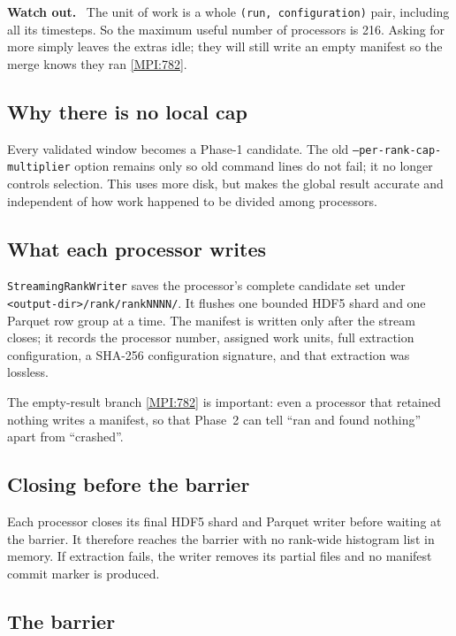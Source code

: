 \documentclass[11pt,a4paper]{report}
\newcommand{\srcbase}{vscode://file/Users/syellapa/Documents/Research/2026/ANSYS/Multi-ScalarPDF}
\newcommand{\srctag}[1]{{\footnotesize\textcolor{TagGray}{[#1]}}}
\newcommand{\MpiL}[1]{\href{\srcbase/EnsightPDFHybridDatasetMPI.py:#1}{\srctag{MPI:#1}}}
\newcommand{\code}[1]{\texttt{#1}}
\renewcommand{\_}{\origtextunderscore\allowbreak}
\newlength{\calloutwidth}
\newcommand{\calloutOpen}{%
  \par\medskip\noindent
  \setlength{\calloutwidth}{\dimexpr\linewidth-2\fboxsep\relax}%
  \begin{lrbox}{\calloutbox}\begin{minipage}{\calloutwidth}}
\newcommand{\calloutClose}[1]{%
  \end{minipage}\end{lrbox}\colorbox{#1}{\usebox{\calloutbox}}\par\medskip}
\newenvironment{caution}
  {\calloutOpen\textbf{Watch out.}\ }
  {\calloutClose{WarnBG}}
\begin{document}
\begin{caution}
The unit of work is a whole \code{(run, configuration)} pair, including all its timesteps.
So the maximum useful number of processors is 216. Asking for more simply leaves the extras
idle; they will still write an empty manifest so the merge knows they ran
\MpiL{782}.
\end{caution}

\subsection*{Why there is no local cap}

Every validated window becomes a Phase-1 candidate. The old
\code{--per-rank-cap-multiplier} option remains only so old command lines do not fail; it no
longer controls selection. This uses more disk, but makes the global result accurate
and independent of how work happened to be divided among processors.

\subsection*{What each processor writes}

\code{StreamingRankWriter} saves the processor's complete candidate set under
\code{<output-dir>/\_rank/rank\_NNNN/}. It flushes one bounded HDF5 shard and one
Parquet row group at a time. The manifest is written only after the stream closes; it records
the processor number, assigned work units, full extraction configuration, a SHA-256
configuration signature, and that extraction was lossless.

The empty-result branch \MpiL{782} is important: even a processor that retained nothing writes
a manifest, so that Phase~2 can tell ``ran and found nothing'' apart from ``crashed''.

\subsection*{Closing before the barrier}

Each processor closes its final HDF5 shard and Parquet writer before waiting at the barrier.
It therefore reaches the barrier with no rank-wide histogram list in memory. If extraction
fails, the writer removes its partial files and no manifest commit marker is produced.

\subsection*{The barrier}
\end{document}
